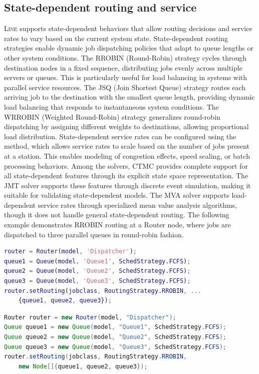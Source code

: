 \subsection{State-dependent routing and service}
\textsc{Line} supports state-dependent behaviors that allow routing decisions and service rates to vary based on the current system state. State-dependent routing strategies enable dynamic job dispatching policies that adapt to queue lengths or other system conditions. The RROBIN (Round-Robin) strategy cycles through destination nodes in a fixed sequence, distributing jobs evenly across multiple servers or queues. This is particularly useful for load balancing in systems with parallel service resources. The JSQ (Join Shortest Queue) strategy routes each arriving job to the destination with the smallest queue length, providing dynamic load balancing that responds to instantaneous system conditions. The WRROBIN (Weighted Round-Robin) strategy generalizes round-robin dispatching by assigning different weights to destinations, allowing proportional load distribution. State-dependent service rates can be configured using the  method, which allows service rates to scale based on the number of jobs present at a station. This enables modeling of congestion effects, speed scaling, or batch processing behaviors. Among the solvers, CTMC provides complete support for all state-dependent features through its explicit state space representation. The JMT solver supports these features through discrete event simulation, making it suitable for validating state-dependent models. The MVA solver supports load-dependent service rates through specialized mean value analysis algorithms, though it does not handle general state-dependent routing. The following example demonstrates RROBIN routing at a Router node, where jobs are dispatched to three parallel queues in round-robin fashion.
\begin{MATLAB}
\begin{lstlisting}[language = matlab]
router = Router(model, 'Dispatcher');
queue1 = Queue(model, 'Queue1', SchedStrategy.FCFS);
queue2 = Queue(model, 'Queue2', SchedStrategy.FCFS);
queue3 = Queue(model, 'Queue3', SchedStrategy.FCFS);
router.setRouting(jobclass, RoutingStrategy.RROBIN, ...
    {queue1, queue2, queue3});
\end{lstlisting}
\end{MATLAB}
\begin{JAVA}
\begin{lstlisting}[language = java, basicstyle=\ttfamily\scriptsize]
Router router = new Router(model, "Dispatcher");
Queue queue1 = new Queue(model, "Queue1", SchedStrategy.FCFS);
Queue queue2 = new Queue(model, "Queue2", SchedStrategy.FCFS);
Queue queue3 = new Queue(model, "Queue3", SchedStrategy.FCFS);
router.setRouting(jobclass, RoutingStrategy.RROBIN,
    new Node[]{queue1, queue2, queue3});
\end{lstlisting}
\end{JAVA}
